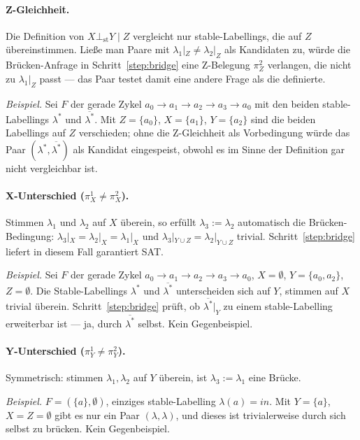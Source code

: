 \paragraph{Z-Gleichheit.}
Die Definition von \(X \bot_{\mathrm{st}} Y \mid Z\) vergleicht nur
stable-Labellings, die auf \(Z\) übereinstimmen. Ließe man Paare mit
\(\lambda_1|_Z \neq \lambda_2|_Z\) als Kandidaten zu, würde die
Brücken-Anfrage in Schritt~\ref{step:bridge} eine Z-Belegung
\(\pi^2_Z\) verlangen, die nicht zu \(\lambda_1|_Z\) passt --- das Paar
testet damit eine andere Frage als die definierte.

\emph{Beispiel.} Sei \(F\) der gerade Zykel
\(a_0\to a_1\to a_2\to a_3\to a_0\) mit den beiden stable-Labellings
\(\lambda^*\) und \(\overline{\lambda^*}\). Mit \(Z=\{a_0\}\),
\(X=\{a_1\}\), \(Y=\{a_2\}\) sind die beiden Labellings auf \(Z\)
verschieden; ohne die Z-Gleichheit als Vorbedingung würde das Paar
\((\lambda^*, \overline{\lambda^*})\) als Kandidat eingespeist, obwohl
es im Sinne der Definition gar nicht vergleichbar ist.

\paragraph{X-Unterschied \texorpdfstring{(\(\pi^1_X \neq \pi^2_X\))}{}.}
Stimmen \(\lambda_1\) und \(\lambda_2\) auf \(X\) überein, so erfüllt
\(\lambda_3 := \lambda_2\) automatisch die Brücken-Bedingung:
\(\lambda_3|_X = \lambda_2|_X = \lambda_1|_X\) und \(\lambda_3|_{Y\cup
Z} = \lambda_2|_{Y\cup Z}\) trivial.
Schritt~\ref{step:bridge} liefert in diesem Fall garantiert SAT.

\emph{Beispiel.} Sei \(F\) der gerade Zykel
\(a_0\to a_1\to a_2\to a_3\to a_0\), \(X=\emptyset\),
\(Y=\{a_0, a_2\}\), \(Z=\emptyset\). Die Stable-Labellings \(\lambda^*\)
und \(\overline{\lambda^*}\) unterscheiden sich auf \(Y\), stimmen auf
\(X\) trivial überein. Schritt~\ref{step:bridge} prüft, ob
\(\overline{\lambda^*}|_Y\) zu einem stable-Labelling erweiterbar
ist --- ja, durch \(\overline{\lambda^*}\) selbst. Kein Gegenbeispiel.

\paragraph{Y-Unterschied \texorpdfstring{(\(\pi^1_Y \neq \pi^2_Y\))}{}.}
Symmetrisch: stimmen \(\lambda_1, \lambda_2\) auf \(Y\) überein, ist
\(\lambda_3 := \lambda_1\) eine Brücke.

\emph{Beispiel.} \(F=(\{a\}, \emptyset)\), einziges stable-Labelling
\(\lambda(a) = \mathit{in}\). Mit \(Y=\{a\}\), \(X=Z=\emptyset\) gibt
es nur ein Paar \((\lambda, \lambda)\), und dieses ist trivialerweise
durch sich selbst zu brücken. Kein Gegenbeispiel.


